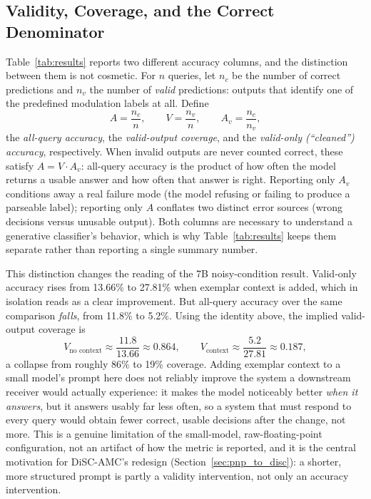 \subsection{Validity, Coverage, and the Correct Denominator}
\label{sec:pnp_validity}

Table~\ref{tab:results} reports two different accuracy columns, and the distinction between them is not cosmetic. For $n$ queries, let $n_c$ be the number of correct predictions and $n_v$ the number of \emph{valid} predictions: outputs that identify one of the predefined modulation labels at all. Define
\begin{equation}
    A = \frac{n_c}{n}, \qquad V = \frac{n_v}{n}, \qquad A_v = \frac{n_c}{n_v},
\end{equation}
the \emph{all-query accuracy}, the \emph{valid-output coverage}, and the \emph{valid-only (``cleaned'') accuracy}, respectively. When invalid outputs are never counted correct, these satisfy $A = V \cdot A_v$: all-query accuracy is the product of how often the model returns a usable answer and how often that answer is right. Reporting only $A_v$ conditions away a real failure mode (the model refusing or failing to produce a parseable label); reporting only $A$ conflates two distinct error sources (wrong decisions versus unusable output). Both columns are necessary to understand a generative classifier's behavior, which is why Table~\ref{tab:results} keeps them separate rather than reporting a single summary number.

This distinction changes the reading of the 7B noisy-condition result. Valid-only accuracy rises from 13.66\% to 27.81\% when exemplar context is added, which in isolation reads as a clear improvement. But all-query accuracy over the same comparison \emph{falls}, from 11.8\% to 5.2\%. Using the identity above, the implied valid-output coverage is
\begin{equation}
    V_{\text{no context}} \approx \frac{11.8}{13.66} \approx 0.864, \qquad V_{\text{context}} \approx \frac{5.2}{27.81} \approx 0.187,
\end{equation}
a collapse from roughly 86\% to 19\% coverage. Adding exemplar context to a small model's prompt here does not reliably improve the system a downstream receiver would actually experience: it makes the model noticeably better \emph{when it answers}, but it answers usably far less often, so a system that must respond to every query would obtain fewer correct, usable decisions after the change, not more. This is a genuine limitation of the small-model, raw-floating-point configuration, not an artifact of how the metric is reported, and it is the central motivation for DiSC-AMC's redesign (Section~\ref{sec:pnp_to_disc}): a shorter, more structured prompt is partly a validity intervention, not only an accuracy intervention.


